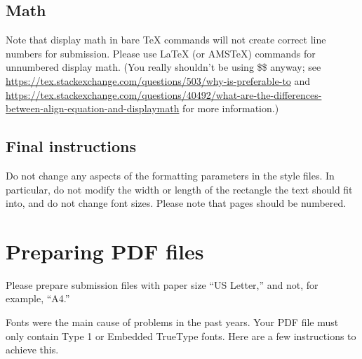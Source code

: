 \documentclass{article}
\begin{document}
\subsection{Math}
Note that display math in bare TeX commands will not create correct line numbers for submission. Please use LaTeX (or AMSTeX) commands for unnumbered display math. (You really shouldn't be using \$\$ anyway; see \url{https://tex.stackexchange.com/questions/503/why-is-preferable-to} and \url{https://tex.stackexchange.com/questions/40492/what-are-the-differences-between-align-equation-and-displaymath} for more information.)

\subsection{Final instructions}

Do not change any aspects of the formatting parameters in the style files.  In
particular, do not modify the width or length of the rectangle the text should
fit into, and do not change font sizes. Please note that pages should be
numbered.


\section{Preparing PDF files}


Please prepare submission files with paper size ``US Letter,'' and not, for
example, ``A4.''


Fonts were the main cause of problems in the past years. Your PDF file must only
contain Type 1 or Embedded TrueType fonts. Here are a few instructions to
achieve this.
\end{document}

